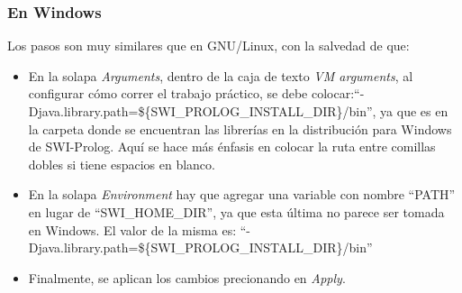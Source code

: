 \subsubsection{En Windows}

Los pasos son muy similares que en GNU/Linux, con la salvedad de que:

\begin{itemize}

\item En la solapa \emph{Arguments}, dentro de la caja de texto \emph{VM
arguments}, al configurar cómo correr el trabajo práctico, se debe
colocar:\newline ``-Djava.library.path=\$\{SWI\_PROLOG\_INSTALL\_DIR\}/bin'',
ya que es en la carpeta  donde se encuentran las librerías en la
distribución para Windows de SWI-Prolog. Aquí se hace más énfasis en colocar la
ruta entre comillas dobles si tiene espacios en blanco.

\item En la solapa \emph{Environment} hay que agregar una variable con nombre
``PATH'' en lugar de ``SWI\_HOME\_DIR'', ya que esta última no parece ser
tomada en Windows. El valor de la misma es:\newline
``-Djava.library.path=\$\{SWI\_PROLOG\_INSTALL\_DIR\}/bin''

\item Finalmente, se aplican los cambios precionando en \emph{Apply}.

\end{itemize}

